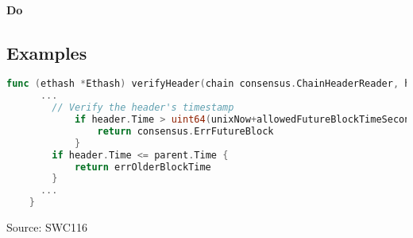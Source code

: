 \paragraph{Do }

\subsection{Examples} 
\begin{lstlisting}[language=go, caption="The restriction for the timestamp in Geth. Source: consensus/ethash/consensus.go \cite{timestamp_code}"]
    func (ethash *Ethash) verifyHeader(chain consensus.ChainHeaderReader, header, parent *types.Header, uncle bool, unixNow int64) error {
      ...
        // Verify the header's timestamp
            if header.Time > uint64(unixNow+allowedFutureBlockTimeSeconds) {
                return consensus.ErrFutureBlock
            }
        if header.Time <= parent.Time {
            return errOlderBlockTime
        }
      ...
    }
    \end{lstlisting}
Source: SWC116 \cite{swc116}